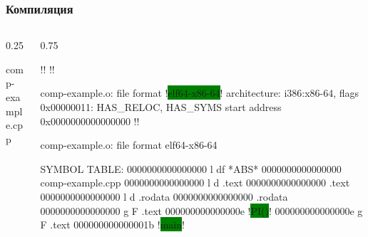 \documentclass[compress, 10pt, aspectratio=169]{beamer}
\begin{document}
\begin{frame}[fragile]

    \frametitle{Компиляция}

    \begin{columns}[T]

        \begin{column}{0.25\textwidth}

                {comp-example.cpp}

        \end{column}

        \begin{column}{0.75\textwidth}

            \begin{terminalwindow}
!!
!!

comp-example.o:     file format !\colorbox{green}{elf64-x86-64}!
architecture: i386:x86-64, flags 0x00000011:
HAS_RELOC, HAS_SYMS
start address 0x0000000000000000
!!

comp-example.o:     file format elf64-x86-64

SYMBOL TABLE:
0000000000000000 l    df *ABS*  0000000000000000 comp-example.cpp
0000000000000000 l    d  .text  0000000000000000 .text
0000000000000000 l    d  .rodata        0000000000000000 .rodata
0000000000000000 g     F .text  000000000000000e !\colorbox{green}{PI()}!
000000000000000e g     F .text  000000000000001b !\colorbox{green}{main}!
            \end{terminalwindow}

        \end{column}

    \end{columns}

\end{frame}
\end{document}
